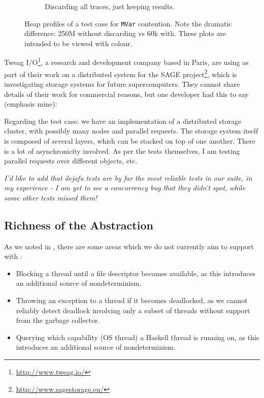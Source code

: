 \begin{figure}
\begin{subfigure}{0.49\textwidth}
    \caption{Discarding all traces, just keeping results.}
  \end{subfigure}
  \caption[Heap profiles of a test case for \texttt{MVar} contention.]{Heap profiles of a test case for \texttt{MVar} contention.  Note the dramatic difference: 250M without discarding vs 60k with.  These plots are intended to be viewed with colour.}\label{fig:discard}
\end{figure}

Tweag I/O\footnote{\url{http://www.tweag.io/}}, a research and
development company based in Paris, are using \dejafu{} as part of
their work on a distributed system for the SAGE
project\footnote{\url{http://www.sagestorage.eu/}}, which is
investigating storage systems for future supercomputers.  They cannot
share details of their work for commercial reasons, but one developer
had this to say (emphasis mine):

\begin{displayquote}
  Regarding the test case: we have an implementation of a distributed
  storage cluster, with possibly many nodes and parallel requests.
  The storage system itself is composed of several layers, which can
  be stacked on top of one another.  There is a lot of asynchronicity
  involved.  As per the tests themselves, I am testing parallel
  requests over different objects, etc.

  \emph{I'd like to add that dejafu tests are by far the most reliable
    tests in our suite, in my experience - I am yet to see a
    concurrency bug that they didn't spot, while some other tests
    missed them!} \parencite{tweag2017}
\end{displayquote}

\subsection{Richness of the Abstraction}

As we noted in , there are some areas which we
do not currently aim to support with \dejafu{}:

\begin{itemize}
\item Blocking a thread until a file descriptor becomes available, as
  this introduces an additional source of nondeterminism.
\item Throwing an exception to a thread if it becomes deadlocked, as
  we cannot reliably detect deadlock involving only a subset of
  threads without support from the garbage collector.
\item Querying which capability (OS thread) a Haskell thread is
  running on, as this introduces an additional source of
  nondeterminism.
\end{itemize}

